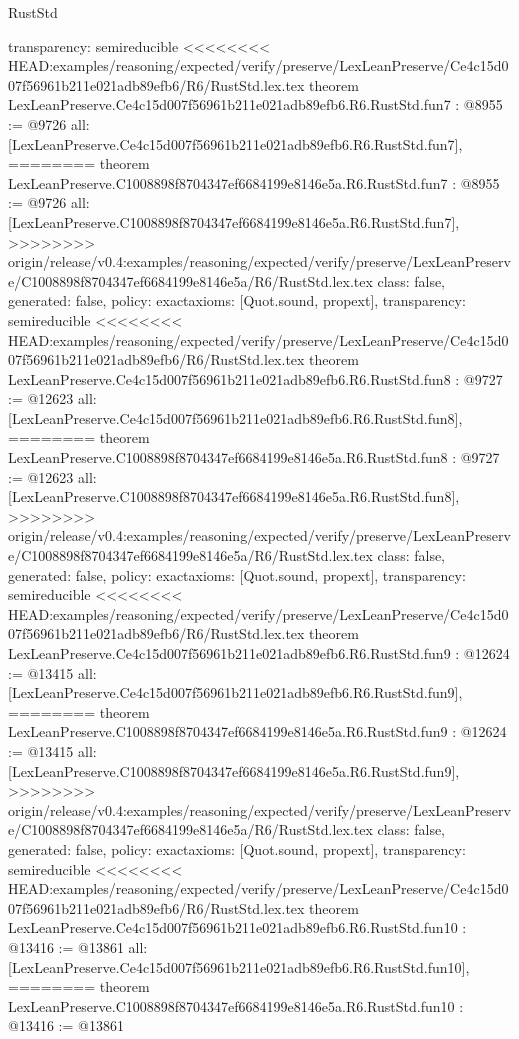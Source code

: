 \begin{lexlean}{RustStd}
\begin{coremodule}
{\begin{coremodule}
{{{{{{{{{{  transparency: semireducible
}
<<<<<<<< HEAD:examples/reasoning/expected/verify/preserve/LexLeanPreserve/Ce4c15d007f56961b211e021adb89efb6/R6/RustStd.lex.tex
theorem LexLeanPreserve.Ce4c15d007f56961b211e021adb89efb6.R6.RustStd.fun7 : @8955 := @9726 {
  all: [LexLeanPreserve.Ce4c15d007f56961b211e021adb89efb6.R6.RustStd.fun7],
========
theorem LexLeanPreserve.C1008898f8704347ef6684199e8146e5a.R6.RustStd.fun7 : @8955 := @9726 {
  all: [LexLeanPreserve.C1008898f8704347ef6684199e8146e5a.R6.RustStd.fun7],
>>>>>>>> origin/release/v0.4:examples/reasoning/expected/verify/preserve/LexLeanPreserve/C1008898f8704347ef6684199e8146e5a/R6/RustStd.lex.tex
  class: false,
  generated: false,
  policy: exact{axioms: [Quot.sound, propext]},
  transparency: semireducible
}
<<<<<<<< HEAD:examples/reasoning/expected/verify/preserve/LexLeanPreserve/Ce4c15d007f56961b211e021adb89efb6/R6/RustStd.lex.tex
theorem LexLeanPreserve.Ce4c15d007f56961b211e021adb89efb6.R6.RustStd.fun8 : @9727 := @12623 {
  all: [LexLeanPreserve.Ce4c15d007f56961b211e021adb89efb6.R6.RustStd.fun8],
========
theorem LexLeanPreserve.C1008898f8704347ef6684199e8146e5a.R6.RustStd.fun8 : @9727 := @12623 {
  all: [LexLeanPreserve.C1008898f8704347ef6684199e8146e5a.R6.RustStd.fun8],
>>>>>>>> origin/release/v0.4:examples/reasoning/expected/verify/preserve/LexLeanPreserve/C1008898f8704347ef6684199e8146e5a/R6/RustStd.lex.tex
  class: false,
  generated: false,
  policy: exact{axioms: [Quot.sound, propext]},
  transparency: semireducible
}
<<<<<<<< HEAD:examples/reasoning/expected/verify/preserve/LexLeanPreserve/Ce4c15d007f56961b211e021adb89efb6/R6/RustStd.lex.tex
theorem LexLeanPreserve.Ce4c15d007f56961b211e021adb89efb6.R6.RustStd.fun9 : @12624 := @13415 {
  all: [LexLeanPreserve.Ce4c15d007f56961b211e021adb89efb6.R6.RustStd.fun9],
========
theorem LexLeanPreserve.C1008898f8704347ef6684199e8146e5a.R6.RustStd.fun9 : @12624 := @13415 {
  all: [LexLeanPreserve.C1008898f8704347ef6684199e8146e5a.R6.RustStd.fun9],
>>>>>>>> origin/release/v0.4:examples/reasoning/expected/verify/preserve/LexLeanPreserve/C1008898f8704347ef6684199e8146e5a/R6/RustStd.lex.tex
  class: false,
  generated: false,
  policy: exact{axioms: [Quot.sound, propext]},
  transparency: semireducible
}
<<<<<<<< HEAD:examples/reasoning/expected/verify/preserve/LexLeanPreserve/Ce4c15d007f56961b211e021adb89efb6/R6/RustStd.lex.tex
theorem LexLeanPreserve.Ce4c15d007f56961b211e021adb89efb6.R6.RustStd.fun10 : @13416 := @13861 {
  all: [LexLeanPreserve.Ce4c15d007f56961b211e021adb89efb6.R6.RustStd.fun10],
========
theorem LexLeanPreserve.C1008898f8704347ef6684199e8146e5a.R6.RustStd.fun10 : @13416 := @13861 {
}}}}}}}}}}}}}}
\end{coremodule}}
\end{coremodule}
\end{lexlean}
